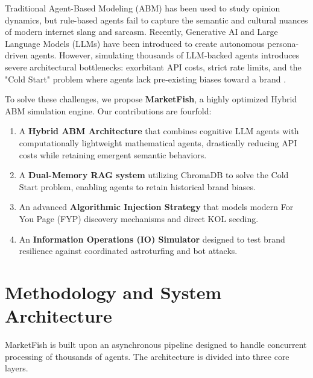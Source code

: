 \documentclass[conference]{IEEEtran}
\begin{document}
Traditional Agent-Based Modeling (ABM) has been used to study opinion dynamics, but rule-based agents fail to capture the semantic and cultural nuances of modern internet slang and sarcasm. Recently, Generative AI and Large Language Models (LLMs) have been introduced to create autonomous persona-driven agents. However, simulating thousands of LLM-backed agents introduces severe architectural bottlenecks: exorbitant API costs, strict rate limits, and the "Cold Start" problem where agents lack pre-existing biases toward a brand \cite{b2}.

To solve these challenges, we propose \textbf{MarketFish}, a highly optimized Hybrid ABM simulation engine. Our contributions are fourfold:
\begin{enumerate}
    \item A \textbf{Hybrid ABM Architecture} that combines cognitive LLM agents with computationally lightweight mathematical agents, drastically reducing API costs while retaining emergent semantic behaviors.
    \item A \textbf{Dual-Memory RAG system} utilizing ChromaDB to solve the Cold Start problem, enabling agents to retain historical brand biases.
    \item An advanced \textbf{Algorithmic Injection Strategy} that models modern For You Page (FYP) discovery mechanisms and direct KOL seeding.
    \item An \textbf{Information Operations (IO) Simulator} designed to test brand resilience against coordinated astroturfing and bot attacks.
\end{enumerate}

\section{Methodology and System Architecture}

MarketFish is built upon an asynchronous pipeline designed to handle concurrent processing of thousands of agents. The architecture is divided into three core layers.
\end{document}
